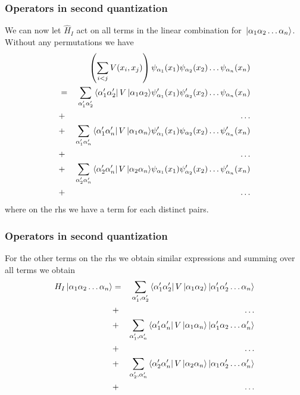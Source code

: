 \frame
{
  \frametitle{Operators in second quantization}
\begin{small}
{\scriptsize
We can now let $\hat{H}_I$ act on all terms in the linear combination for $\,|{\alpha_1\alpha_2\dots\alpha_n}\rangle$. Without any permutations we have
\begin{eqnarray}
	&& \left( \sum_{i<j} V(x_i,x_j) \right) \psi_{\alpha_1}(x_1)\psi_{\alpha_2}(x_2)\dots \psi_{\alpha_n}(x_n) \nonumber \\
	&=& \sum_{\alpha_1'\alpha_2'} \element{\alpha_1'\alpha_2'}{V}{\alpha_1\alpha_2}
		\psi_{\alpha_1}'(x_1)\psi_{\alpha_2}'(x_2)\dots \psi_{\alpha_n}(x_n) \nonumber \\
	& +& \dots \nonumber \\
	&+& \sum_{\alpha_1'\alpha_n'} \element{\alpha_1'\alpha_n'}{V}{\alpha_1\alpha_n}
		\psi_{\alpha_1}'(x_1)\psi_{\alpha_2}(x_2)\dots \psi_{\alpha_n}'(x_n) \nonumber \\
	& +& \dots \nonumber \\
	&+& \sum_{\alpha_2'\alpha_n'} \element{\alpha_2'\alpha_n'}{V}{\alpha_2\alpha_n}
		\psi_{\alpha_1}(x_1)\psi_{\alpha_2}'(x_2)\dots \psi_{\alpha_n}'(x_n) \nonumber \\
	 & +& \dots \label{eq:2-33}
\end{eqnarray}
where on the rhs we have a term for each distinct pairs. 
}
\end{small}
}



\frame
{
  \frametitle{Operators in second quantization}
\begin{small}
{\scriptsize
For the other terms on the rhs we obtain similar expressions  and summing over all terms we obtain
\begin{eqnarray}
	H_I \ket{\alpha_1\alpha_2\hdots\alpha_n} &=& \sum_{\alpha_1', \alpha_2'} \element{\alpha_1'\alpha_2'}{V}{\alpha_1\alpha_2}
		\ket{\alpha_1'\alpha_2'\hdots\alpha_n} \nonumber \\
	&+& \hdots \nonumber \\
	&+& \sum_{\alpha_1', \alpha_n'} \element{\alpha_1'\alpha_n'}{V}{\alpha_1\alpha_n}
		\ket{\alpha_1'\alpha_2\hdots\alpha_n'} \nonumber \\
	&+& \hdots \nonumber \\
	&+& \sum_{\alpha_2', \alpha_n'} \element{\alpha_2'\alpha_n'}{V}{\alpha_2\alpha_n}
		\ket{\alpha_1\alpha_2'\hdots\alpha_n'} \nonumber \\
	 &+& \hdots \label{eq:2-34}
\end{eqnarray}
}
\end{small}
}


